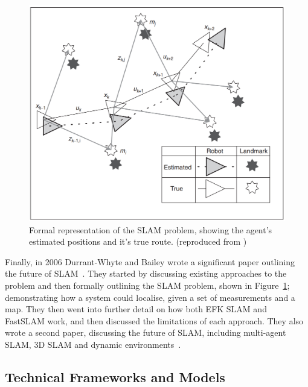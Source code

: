 \documentclass[12pt]{article}
\begin{document}
\begin{figure}[h]
    \centering
    \begin{minipage}{0.8\textwidth}
        \centering
        \includegraphics[width=\linewidth]{SLAM_problem} %
        \caption[Short caption]{Formal representation of the SLAM problem, showing the agent's estimated positions and it's true route. (reproduced from \cite{SLAM_summary})}
        \label{fig:SLAM_problem}
    \end{minipage}\hfill
\end{figure}

Finally, in 2006 Durrant-Whyte and Bailey wrote a significant paper outlining the future of SLAM~\cite{SLAM_summary}.
They started by discussing existing approaches to the problem and then formally outlining the SLAM problem, shown in Figure~\ref{fig:SLAM_problem};
demonstrating how a system could localise, given a set of measurements and a map.
They then went into further detail on how both EFK SLAM and FastSLAM work, and then discussed the limitations of each approach.
They also wrote a second paper, discussing the future of SLAM, including multi-agent SLAM, 3D SLAM and dynamic environments~\cite{Further_SLAM}.

\subsection{Technical Frameworks and Models} %
\end{document}
